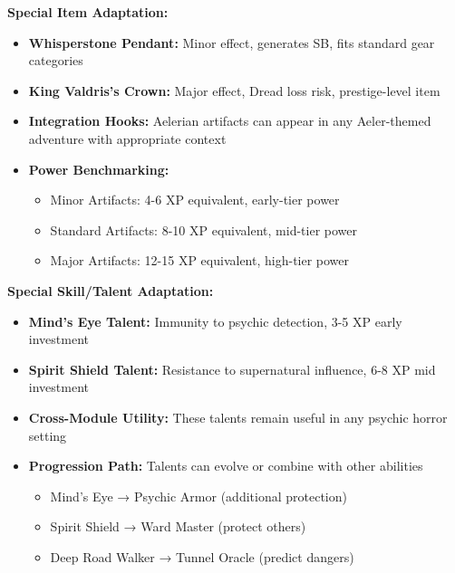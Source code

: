 \documentclass[11pt]{article}
\begin{document}
\begin{itemize}
\begin{itemize}
\begin{itemize}
\begin{itemize}
\textbf{Special Item Adaptation:} \begin{itemize} \item \textbf{Whisperstone Pendant:} Minor effect, generates SB, fits standard gear categories \item \textbf{King Valdris's Crown:} Major effect, Dread loss risk, prestige-level item \item \textbf{Integration Hooks:} Aelerian artifacts can appear in any Aeler-themed adventure with appropriate context \item \textbf{Power Benchmarking:} \begin{itemize} \item Minor Artifacts: 4-6 XP equivalent, early-tier power \item Standard Artifacts: 8-10 XP equivalent, mid-tier power \item Major Artifacts: 12-15 XP equivalent, high-tier power \end{itemize} \end{itemize}

\textbf{Special Skill/Talent Adaptation:} \begin{itemize} \item \textbf{Mind's Eye Talent:} Immunity to psychic detection, 3-5 XP early investment \item \textbf{Spirit Shield Talent:} Resistance to supernatural influence, 6-8 XP mid investment \item \textbf{Cross-Module Utility:} These talents remain useful in any psychic horror setting \item \textbf{Progression Path:} Talents can evolve or combine with other abilities \begin{itemize} \item Mind's Eye → Psychic Armor (additional protection) \item Spirit Shield → Ward Master (protect others) \item Deep Road Walker → Tunnel Oracle (predict dangers) \end{itemize} \end{itemize}


\end{itemize}
\end{itemize}
\end{itemize}
\end{itemize}
\end{document}
